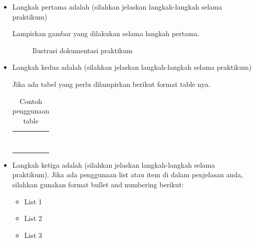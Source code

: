 \begin{itemize}
  \item Langkah pertama adalah (silahkan jelaskan langkah-langkah
      selama praktikum)

      Lampirkan gambar yang dilakukan selama langkah pertama.

      \begin{figure}[H]
        \centering
        \caption{Ilustrasi dokumentasi praktikum}
      \end{figure}
  \newpage %
  \item Langkah kedua adalah (silahkan jelaskan langkah-langkah
      selama praktikum)

      Jika ada tabel yang perlu dilampirkan berikut format table nya.

      \begin{table}[H]
        \centering
        \caption{Contoh penggunaan table}
        \linespread{1}\fontsize{8}{10}\selectfont
        \setlength{\tabcolsep}{3pt}
        \renewcommand{\arraystretch}{0.9}
        \begin{tabular}{!{\color{tabline}\vrule}>{\centering\arraybackslash}p{9mm}!{\color{tabline}\vrule}p{30mm}!{\color{tabline}\vrule}p{30mm}!{\color{tabline}\vrule}p{30mm}!{\color{tabline}\vrule}}
          \hline
           &  &  &  \\
          \hline
          & & & \\ \hline
          & & & \\ \hline
          & & & \\ \hline
          & & & \\ \hline
          & & & \\ \hline
          & & & \\ \hline
          & & & \\ \hline
          & & & \\ \hline
        \end{tabular}
      \end{table}
  \item Langkah ketiga adalah (silahkan jelaskan langkah-langkah
      selama praktikum). Jika ada penggunaan list atau item di dalam
      penjelasan anda, silahkan gunakan format bullet and numbering berikut:
      \begin{itemize}
        \item List 1
        \item List 2
        \item List 3
      \end{itemize}
\end{itemize}
\par
